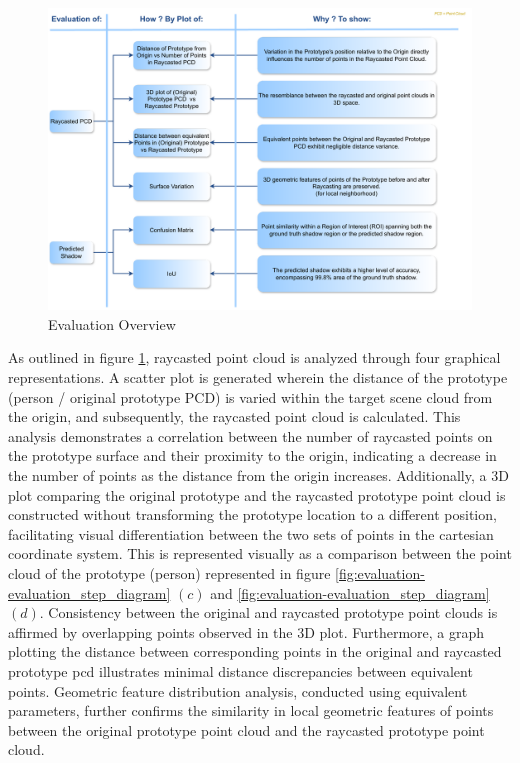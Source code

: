 \begin{figure}[htbp]
    \centering
    \includegraphics[width=1\linewidth]{97_graphics//evaluation/evaluation_block_diagram.pdf}
    \caption{Evaluation Overview}
    \label{fig:evaluation-evaluation_block_diagram}
\end{figure}

As outlined in figure \ref{fig:evaluation-evaluation_block_diagram}, raycasted point cloud is analyzed through four graphical representations. A scatter plot is generated wherein the distance of the prototype (person / original prototype PCD) is varied within the target scene cloud from the origin, and subsequently, the raycasted point cloud is calculated. This analysis demonstrates a correlation between the number of raycasted points on the prototype surface and their proximity to the origin, indicating a decrease in the number of points as the distance from the origin increases. Additionally, a 3D plot comparing the original prototype and the raycasted prototype point cloud is constructed without transforming the prototype location to a different position, facilitating visual differentiation between the two sets of points in the cartesian coordinate system. This is represented visually as a comparison between the point cloud of the prototype (person) represented in figure \ref{fig:evaluation-evaluation_step_diagram} \((c)\) and \ref{fig:evaluation-evaluation_step_diagram} \((d)\). Consistency between the original and raycasted prototype point clouds is affirmed by overlapping points observed in the 3D plot. Furthermore, a graph plotting the distance between corresponding points in the original and raycasted prototype \acrshort{pcd} illustrates minimal distance discrepancies between equivalent points. Geometric feature distribution analysis, conducted using equivalent parameters, further confirms the similarity in local geometric features of points between the original prototype point cloud and the raycasted prototype point cloud.

